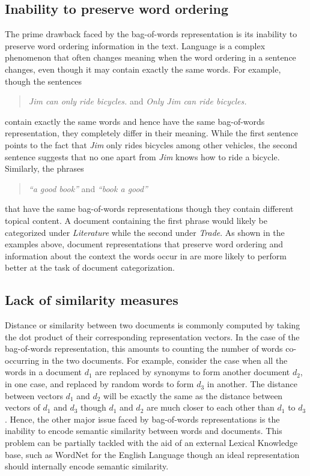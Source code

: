 \subsection{Inability to preserve word ordering}
The prime drawback faced by the bag-of-words representation is its 
inability to preserve word ordering information in the text. Language 
is a complex phenomenon that often changes meaning when the word 
ordering in a sentence changes, even though it may contain exactly the 
same words. For example,  though the sentences
\begin{quote}
\centering
\emph{ 	Jim can only ride bicycles. } and \emph{ 	Only Jim can ride bicycles. }
\end{quote}
contain exactly the same words and hence have the same bag-of-words representation, they completely differ in their meaning. While the first sentence points to the fact that \emph{Jim} only rides bicycles among other vehicles, the second sentence suggests that no one apart from \emph{Jim} knows how to ride a bicycle. 
Similarly, the phrases 
\begin{quote}
\centering
\emph{ 	``a good book'' } and \emph{ 	``book a good'' }
\end{quote}
that have the same bag-of-words representations though they contain different topical content. A document containing the first phrase would likely be categorized under \emph{Literature} while the second under \emph{Trade}.
As shown in the examples above, document representations that preserve word ordering and information about the context the words occur in are more likely to perform better at the task of document categorization.

\subsection{Lack of similarity measures}
Distance or similarity between two documents is commonly computed by 
taking the dot product of their corresponding representation vectors. 
In the case of the bag-of-words representation, this amounts to counting 
the number of words co-occurring in the two documents. For example, 
consider the case when all the words in a document $d_{1}$ are 
replaced by synonyms to form another document $d_{2}$, in one case, 
and replaced by random words to form $d_{3}$ in another. The distance 
between vectors $d_{1}$ and $d_{2}$ will be exactly the same as the 
distance between vectors of $d_{1}$ and $d_{3}$ though $d_{1}$ and 
$d_{2}$ are much closer to each other than $d_1$ to $d_{3}$. 
Hence, the other major issue faced by bag-of-words representations 
is the inability to encode semantic similarity between words and documents. 
This problem can be partially tackled with the aid of an external Lexical Knowledge base, such as WordNet for the English Language though an ideal representation should internally encode semantic similarity.

